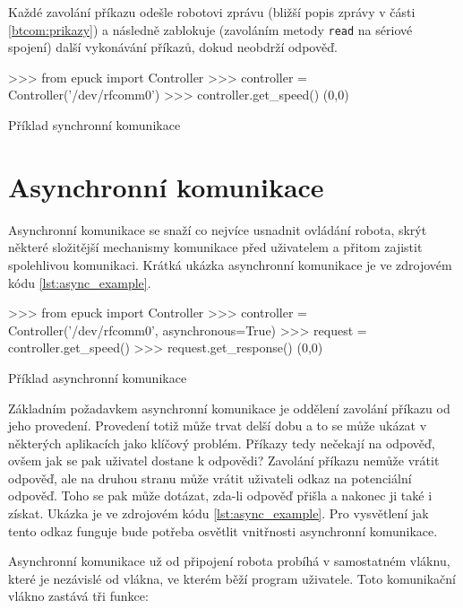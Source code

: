     Každé zavolání příkazu odešle robotovi zprávu (bližší popis zprávy v části
    \ref{btcom:prikazy}) a následně zablokuje (zavoláním metody {\tt read} na
    sériové spojení) další vykonávání příkazů, dokud neobdrží odpověď.

    \begin{listing}[h]
    \begin{pyc}
>>> from epuck import Controller
>>> controller = Controller('/dev/rfcomm0')
>>> controller.get_speed()
(0,0)
    \end{pyc}
    \caption{Příklad synchronní komunikace}
    \label{lst:sync_example}
    \end{listing}

    \section{Asynchronní komunikace}
    \label{async-impl}

    Asynchronní komunikace se snaží co nejvíce usnadnit ovládání robota, skrýt
    některé složitější mechanismy komunikace před uživatelem a přitom zajistit
    spolehlivou komunikaci. Krátká ukázka asynchronní komunikace je ve
    zdrojovém kódu \ref{lst:async_example}.

    \begin{listing}[h]
    \begin{pyc}
>>> from epuck import Controller
>>> controller = Controller('/dev/rfcomm0', asynchronous=True)
>>> request = controller.get_speed()
>>> request.get_response()
(0,0)
    \end{pyc}
    \caption{Příklad asynchronní komunikace}
    \label{lst:async_example}
    \end{listing}

    Základním požadavkem asynchronní komunikace je oddělení zavolání příkazu od
    jeho provedení. Provedení totiž může trvat delší dobu a to se může ukázat v
    některých aplikacích jako klíčový problém. Příkazy tedy nečekají na
    odpověď, ovšem jak se pak uživatel dostane k odpovědi? Zavolání příkazu
    nemůže vrátit odpověď, ale na druhou stranu může vrátit uživateli odkaz na
    potenciální odpověď. Toho se pak může dotázat, zda-li odpověď přišla a
    nakonec ji také i získat. Ukázka je ve zdrojovém kódu
    \ref{lst:async_example}. Pro vysvětlení jak tento odkaz funguje bude
    potřeba osvětlit vnitřnosti asynchronní komunikace.

    Asynchronní komunikace už od připojení robota probíhá v samostatném vláknu,
    které je nezávislé od vlákna, ve kterém běží program uživatele. Toto
    komunikační vlákno zastává tři funkce:

